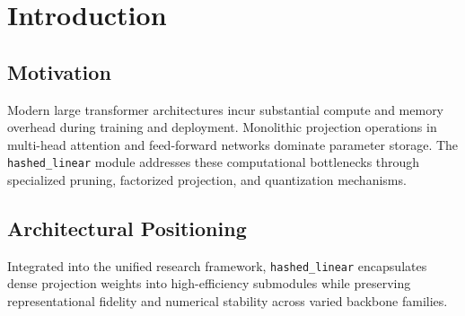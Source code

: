 \section{Introduction}

\subsection{Motivation}
Modern large transformer architectures incur substantial compute and memory overhead during training and deployment. Monolithic projection operations in multi-head attention and feed-forward networks dominate parameter storage. The \texttt{hashed_linear} module addresses these computational bottlenecks through specialized pruning, factorized projection, and quantization mechanisms.

\subsection{Architectural Positioning}
Integrated into the unified research framework, \texttt{hashed_linear} encapsulates dense projection weights into high-efficiency submodules while preserving representational fidelity and numerical stability across varied backbone families.
